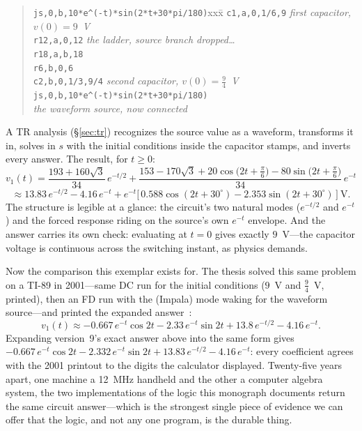 \documentclass[11pt,oneside]{report}
\newcommand{\code}[1]{\texttt{#1}}
\begin{document}
\begin{quote}
\begin{tabbing}
\code{js,0,b,10*e\^{}(-t)*sin(2*t+30*pi/180)}xxx\=\kill
\code{c1,a,0,1/6,9}     \> \emph{first capacitor, $v(0) = 9$~V} \\
\code{r12,a,0,12}       \> \emph{the ladder, source branch dropped\ldots} \\
\code{r18,a,b,18} \\
\code{r6,b,0,6} \\
\code{c2,b,0,1/3,9/4}   \> \emph{second capacitor, $v(0) = \tfrac94$~V} \\
\code{js,0,b,10*e\^{}(-t)*sin(2*t+30*pi/180)} \\
                        \> \emph{the waveform source, now connected}
\end{tabbing}
\end{quote}

\noindent A TR analysis (\S\ref{sec:tr}) recognizes the source value
as a waveform, transforms it in, solves in $s$ with the initial
conditions inside the capacitor stamps, and inverts every answer.
The result, for $t \ge 0$:
\[
v_1(t) = \frac{193+160\sqrt{3}}{34}\,e^{-t/2}
+ \frac{153-170\sqrt{3}
+ 20\cos\!\bigl(2t+\tfrac{\pi}{6}\bigr)
- 80\sin\!\bigl(2t+\tfrac{\pi}{6}\bigr)}{34}\,e^{-t}
\]
\[
\approx 13.83\,e^{-t/2}
- 4.16\,e^{-t}
+ e^{-t}\bigl[\,0.588\cos(2t+30^{\circ})
- 2.353\sin(2t+30^{\circ})\,\bigr]~\mathrm{V}.
\]
The structure is legible at a glance: the circuit's two natural modes
($e^{-t/2}$ and $e^{-t}$) and the forced response riding on the
source's own $e^{-t}$ envelope. And the answer carries its own check:
evaluating at $t=0$ gives exactly $9$~V---the capacitor voltage is
continuous across the switching instant, as physics demands.

Now the comparison this exemplar exists for. The thesis solved this
same problem on a TI-89 in 2001---same DC run for the initial
conditions ($9$~V and $\tfrac94$~V, printed), then an FD run with
the (Impala) mode waking for the waveform source---and printed the
expanded answer~\cite[\S12.3]{thesis2000}:
\[
v_1(t) \approx -0.667\,e^{-t}\cos 2t - 2.33\,e^{-t}\sin 2t
+ 13.8\,e^{-t/2} - 4.16\,e^{-t}.
\]
Expanding version~9's exact answer above into the same form gives
$-0.667\,e^{-t}\cos 2t - 2.332\,e^{-t}\sin 2t + 13.83\,e^{-t/2} -
4.16\,e^{-t}$: every coefficient agrees with the 2001 printout to
the digits the calculator displayed. Twenty-five years apart, one
machine a 12~MHz handheld and the other a computer algebra system,
the two implementations of the logic this monograph documents return
the same circuit answer---which is the strongest single piece of
evidence we can offer that the logic, and not any one program, is
the durable thing.
\end{document}
